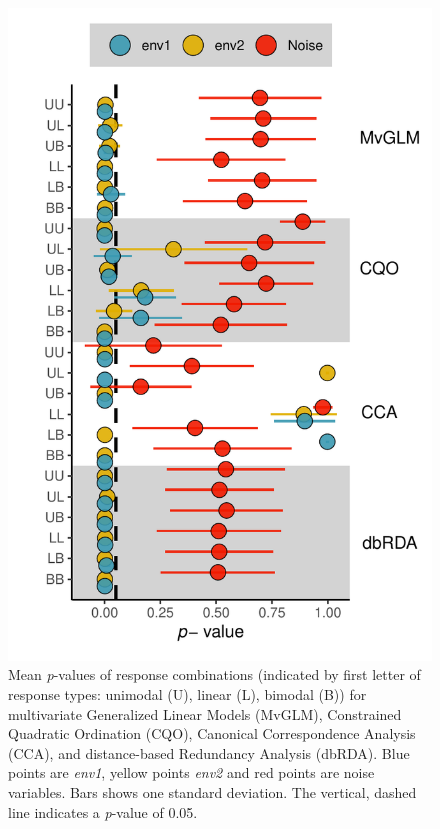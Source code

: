 \documentclass[a4paper,11pt]{article}
\begin{document}
    \begin{figure}
        \centering
        \includegraphics[scale = 0.7]{figures/190912_error_bar.pdf}
        \caption{Mean \textit{p}-values of response combinations (indicated by first letter of response types: unimodal (U), linear (L), bimodal (B)) for multivariate Generalized Linear Models (MvGLM), Constrained Quadratic Ordination (CQO), Canonical Correspondence Analysis (CCA), and distance-based Redundancy Analysis (dbRDA). Blue points are \textit{env1}, yellow points \textit{env2} and red points are noise variables. Bars shows one standard deviation. The vertical, dashed line indicates a \textit{p}-value of 0.05.}
        \label{fig:result1::p-valueComparison}
    \end{figure}
\end{document}
